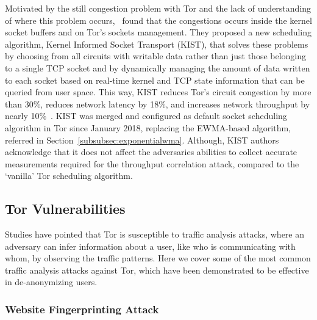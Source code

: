 Motivated by the still congestion problem with Tor and the lack of understanding of where this problem occurs,~\citeauthor{KIST} found that the congestions occurs inside the kernel socket buffers and on Tor's sockets management. They proposed a new scheduling algorithm, Kernel Informed Socket Transport (KIST), that solves these problems by choosing from all circuits with writable data rather than just those belonging to a single TCP socket and by dynamically managing the amount of data written to each socket based on real-time kernel and TCP state information that can be queried from user space. This way, KIST reduces Tor's circuit congestion by more than 30\%, reduces network latency by 18\%, and increases network throughput by nearly 10\%~\cite{KIST}. 
KIST was merged and configured as default socket scheduling algorithm in Tor since January 2018, replacing the EWMA-based algorithm, referred in Section~\ref{subsubsec:exponentialwma}. Although, KIST authors acknowledge that it does not affect the adversaries abilities to collect accurate measurements required for the throughput correlation attack, compared to the `vanilla' Tor scheduling algorithm.

\subsection{Tor Vulnerabilities}\label{subsec:tor_vulnerabilities}

Studies have pointed that Tor is susceptible to traffic analysis attacks, where an adversary can infer information about a user, like who is communicating with whom, by observing the traffic patterns. Here we cover some of the most common traffic analysis attacks against Tor, which have been demonstrated to be effective in de-anonymizing users.

\subsubsection{Website Fingerprinting Attack}\label{subsubsec:website_fingerprinting_attack}

